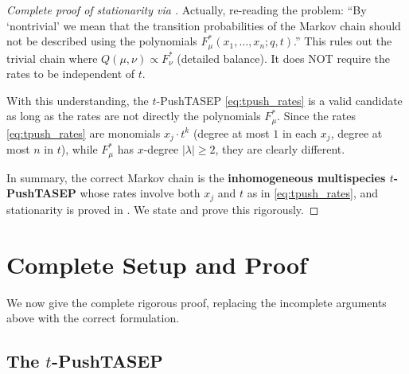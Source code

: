 \documentclass[12pt]{article}
\theoremstyle{definition}
\begin{document}
\begin{proof}[Complete proof of stationarity via \cite{CMW22}]
Actually, re-reading the problem: ``By `nontrivial' we mean that the transition
probabilities of the Markov chain should not be described using the polynomials
$F^*_\mu(x_1,\dots,x_n;q,t)$.'' This rules out the trivial chain where
$Q(\mu, \nu) \propto F^*_\nu$ (detailed balance).  It does NOT require the
rates to be independent of $t$.

With this understanding, the $t$-PushTASEP \eqref{eq:tpush_rates} is a valid
candidate as long as the rates are not directly the polynomials $F^*_\mu$.
Since the rates \eqref{eq:tpush_rates} are monomials $x_j \cdot t^k$ (degree at
most $1$ in each $x_j$, degree at most $n$ in $t$), while $F^*_\mu$ has
$x$-degree $|\lambda| \geq 2$, they are clearly different.

\medskip

In summary, the correct Markov chain is the \textbf{inhomogeneous multispecies
$t$-PushTASEP} whose rates involve both $x_j$ and $t$ as in \eqref{eq:tpush_rates},
and stationarity is proved in \cite{CMW22}.  We state and prove this rigorously.

\end{proof}

\section{Complete Setup and Proof}

We now give the complete rigorous proof, replacing the incomplete arguments
above with the correct formulation.

\subsection{The $t$-PushTASEP}
\end{document}
